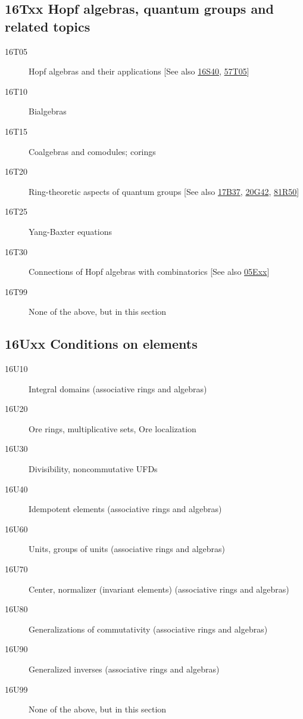 \subsection*{16Txx  Hopf algebras, quantum groups and related topics }\label{16Txx}
\begin{description}  
\item [16T05]\label{16T05} Hopf algebras and their applications [See also \hyperref[16S40]{16S40}, \hyperref[57T05]{57T05}]
\item [16T10]\label{16T10} Bialgebras
\item [16T15]\label{16T15} Coalgebras and comodules; corings
\item [16T20]\label{16T20} Ring-theoretic aspects of quantum groups [See also \hyperref[17B37]{17B37}, \hyperref[20G42]{20G42}, \hyperref[81R50]{81R50}]
\item [16T25]\label{16T25} Yang-Baxter equations
\item [16T30]\label{16T30} Connections of Hopf algebras with combinatorics [See also \hyperref[05Exx]{05Exx}]
\item [16T99]\label{16T99} None of the above, but in this section
\end{description}
\subsection*{16Uxx  Conditions on elements }\label{16Uxx}
\begin{description}  
\item [16U10]\label{16U10} Integral domains (associative rings and algebras)
\item [16U20]\label{16U20} Ore rings, multiplicative sets, Ore localization
\item [16U30]\label{16U30} Divisibility, noncommutative UFDs
\item [16U40]\label{16U40} Idempotent elements (associative rings and algebras)
\item [16U60]\label{16U60} Units, groups of units (associative rings and algebras)
\item [16U70]\label{16U70} Center, normalizer (invariant elements) (associative rings and algebras)
\item [16U80]\label{16U80} Generalizations of commutativity (associative rings and algebras)
\item [16U90]\label{16U90} Generalized inverses (associative rings and algebras)
\item [16U99]\label{16U99} None of the above, but in this section
\end{description}
